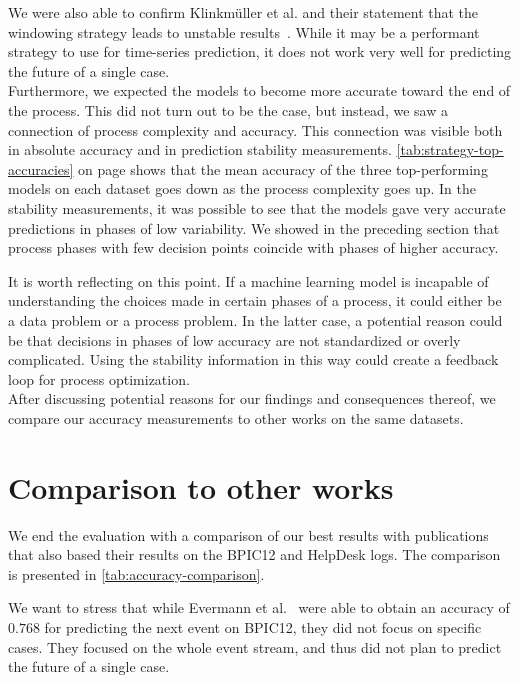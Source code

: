 We were also able to confirm Klinkmüller et al. and their statement that the windowing strategy leads to unstable results~\cite{klinkmuller2018reliablemonitoring}.
While it may be a performant strategy to use for time-series prediction, it does not work very well for predicting the future of a single case.\\

Furthermore, we expected the models to become more accurate toward the end of the process.
This did not turn out to be the case, but instead, we saw a connection of process complexity and accuracy.
This connection was visible both in absolute accuracy and in prediction stability measurements.
\autoref{tab:strategy-top-accuracies} on page \pageref{tab:strategy-top-accuracies} shows that the mean accuracy of the three top-performing models on each dataset goes down as the process complexity goes up.
In the stability measurements, it was possible to see that the models gave very accurate predictions in phases of low variability.
We showed in the preceding section that process phases with few decision points coincide with phases of higher accuracy.

It is worth reflecting on this point.
If a machine learning model is incapable of understanding the choices made in certain phases of a process, it could either be a data problem or a process problem.
In the latter case, a potential reason could be that decisions in phases of low accuracy are not standardized or overly complicated.
Using the stability information in this way could create a feedback loop for process optimization.\\

After discussing potential reasons for our findings and consequences thereof, we compare our accuracy measurements to other works on the same datasets.

\section{Comparison to other works}
We end the evaluation with a comparison of our best results with publications that also based their results on the BPIC12 and HelpDesk logs.
The comparison is presented in \autoref{tab:accuracy-comparison}.

We want to stress that while Evermann et al.~\cite{evermann2016} were able to obtain an accuracy of $0.768$ for predicting the next event on BPIC12, they did not focus on specific cases.
They focused on the whole event stream, and thus did not plan to predict the future of a single case.

